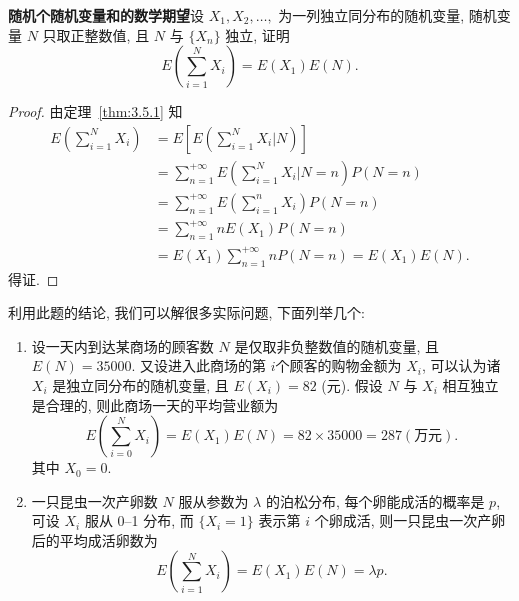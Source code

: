 	\begin{example}\label{exam:3.5.10}
		\textbf{随机个随机变量和的数学期望}\quad 设 $X_1,X_2,\ldots,$ 为一列独立同分布的随机变量, 随机变量 $N$ 
		只取正整数值, 且 $N$ 与 $\{X_n\}$ 独立, 证明
		\[
			E\left(\sum_{i=1}^{N} X_{i}\right)=E\left(X_{1}\right) E(N).
			\]
	\end{example}
	\begin{proof}
		由定理~\ref{thm:3.5.1} 知
		\begin{align*} 
			E\left(\sum_{i=1}^{N} X_{i}\right) &=E\left[E\left(\sum_{i=1}^{N} X_{i} | N\right)\right] \\
			&=\sum_{n=1}^{+\infty} E\left(\sum_{i=1}^{N} X_{i} | N=n\right) P(N=n) \\
			&=\sum_{n=1}^{+\infty} E\left(\sum_{i=1}^{n} X_{i}\right) P(N=n) \\
			&=\sum_{n=1}^{+\infty} n E\left(X_{1}\right) P(N=n) \\
			&=E\left(X_{1}\right) \sum_{n=1}^{+\infty} n P(N=n)=E\left(X_{1}\right) E(N). 
		\end{align*}
		得证.
	\end{proof}
	利用此题的结论, 我们可以解很多实际问题, 下面列举几个:
	\begin{enumerate}
		\item 设一天内到达某商场的顾客数 $N$ 是仅取非负整数值的随机变量, 且 $E(N)=35000$. 又设进入此商场的第 $i$个顾客的购物金额为 $X_i$, 可以认为诸 $X_i$ 是独立同分布的随机变量, 且 $E(X_i)=82$ (元). 假设 $N$ 与
		 $X_i$ 相互独立是合理的, 则此商场一天的平均营业额为
		 \[
			E\left(\sum_{i=0}^{N} X_{i}\right)=E\left(X_{1}\right) E(N)=82 \times 35000=287 (\text{万元}).
			\]
		其中 $X_0=0$.
		\item 一只昆虫一次产卵数 $N$ 服从参数为 $\lambda$ 的泊松分布, 每个卵能成活的概率是 $p$, 可设 $X_i$ 
		服从 0--1 分布, 而 $\{X_i=1\}$ 表示第 $i$ 个卵成活, 则一只昆虫一次产卵后的平均成活卵数为
		\[
			E\left(\sum_{i=1}^{N} X_{i}\right)=E\left(X_{1}\right) E(N)=\lambda p.
			\]
	\end{enumerate}
